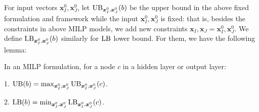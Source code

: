 	
			


			
			





			
			
			
			
			
\iffalse			
			For input vectors $\boldsymbol{x}^0_I,\boldsymbol{x}^0_J$, let $\mathrm{UB}_{\boldsymbol{x}^0_I,\boldsymbol{x}^0_J}(b)$ be the upper bound in the above fixed formulation and framework while the input $\boldsymbol{x}^0_I,\boldsymbol{x}^0_J$ is fixed: that is, besides the constraints in above MILP models, we add new constraints $\boldsymbol{x}_I,\boldsymbol{x}_J=\boldsymbol{x}^0_I,\boldsymbol{x}^0_J$. We  define $\mathrm{LB}_{\boldsymbol{x}^0_I,\boldsymbol{x}^0_J}(b)$ similarly for $\mathrm{LB}$ lower bound. For them, we have the following lemma:
			
			\begin{lemma} In an MILP formulation, for a node $c$ in a hidden layer or output layer:
				
				1. $\mathrm{UB}(b)=\max_{\boldsymbol{x}^0_I,\boldsymbol{x}^0_J}\mathrm{UB}_{\boldsymbol{x}^0_I,\boldsymbol{x}^0_J}(c)$. 
				
				2. $\mathrm{LB}(b)=\min_{\boldsymbol{x}^0_I,\boldsymbol{x}^0_J}\mathrm{LB}_{\boldsymbol{x}^0_I,\boldsymbol{x}^0_J}(c)$. 
			\end{lemma}
			
